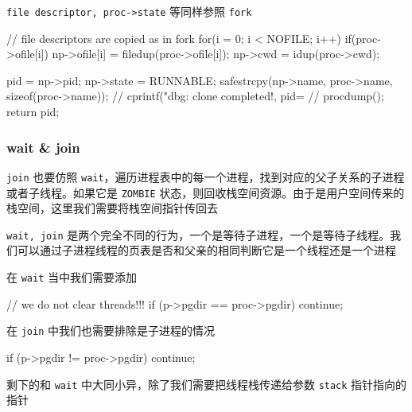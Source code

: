 \texttt{file descriptor, proc->state} 等同样参照 \texttt{fork}

\begin{ccode}
    // file descriptors are copied as in fork
    for(i = 0; i < NOFILE; i++)
    if(proc->ofile[i])
    np->ofile[i] = filedup(proc->ofile[i]);
    np->cwd = idup(proc->cwd);
                   
    pid = np->pid;
    np->state = RUNNABLE;
    safestrcpy(np->name, proc->name, sizeof(proc->name));
    // cprintf("dbg: clone completed!, pid=%
    // procdump();
    return pid;
\end{ccode}

\subsubsection{wait \& join}

\texttt{join} 也要仿照 \texttt{wait}，遍历进程表中的每一个进程，找到对应的父子关系的子进程或者子线程。如果它是 \texttt{ZOMBIE} 状态，则回收栈空间资源。由于是用户空间传来的栈空间，这里我们需要将栈空间指针传回去

\texttt{wait, join} 是两个完全不同的行为，一个是等待子进程，一个是等待子线程。我们可以通过子进程线程的页表是否和父亲的相同判断它是一个线程还是一个进程

在 \texttt{wait} 当中我们需要添加

\begin{ccode}
    // we do not clear threads!!!
    if (p->pgdir == proc->pgdir)
    continue;
\end{ccode}

在 \texttt{join} 中我们也需要排除是子进程的情况

\begin{ccode}
    if (p->pgdir != proc->pgdir)
    continue;
\end{ccode}

剩下的和 \texttt{wait} 中大同小异，除了我们需要把线程栈传递给参数 \texttt{stack} 指针指向的指针

